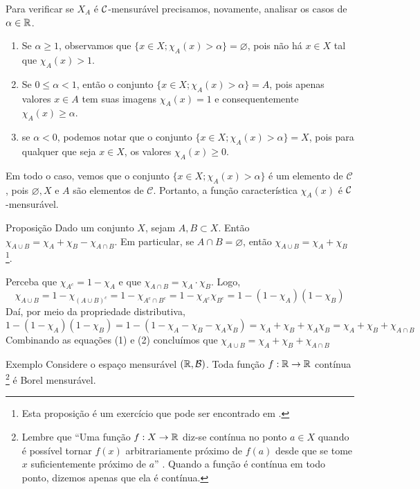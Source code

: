 Para verificar se $X_A$ é $\operatorname{\mathcal{C}}$-mensurável precisamos, novamente, analisar os casos de $\alpha \in \mathbb{R}$.
	\begin{enumerate}[label*= (\Roman*)]
		\item Se $\alpha \geq 1$, observamos que $\{x \in X; \chi_A(x)>  \alpha\} = \varnothing$, pois não há $x \in X$ tal que $\chi_A(x) > 1$.  
		\item Se $ 0 \leq \alpha < 1$, então o conjunto $\{x \in X; \chi_A(x)>  \alpha\} = A$, pois apenas valores $x \in A$ tem suas imagens $\chi_A(x) = 1$ e consequentemente $\chi_A(x) \geq \alpha$.
		\item  se $\alpha < 0$, podemos notar que o conjunto $\{x \in X; \chi_A(x)>  \alpha\} = X$, pois para qualquer que seja $x \in X$, os valores $\chi_A(x) \geq 0$.
	\end{enumerate}
Em todo o caso, vemos que o conjunto $\{x \in X; \chi_A(x)>  \alpha\}$ é um elemento de $\mathcal{C}$, pois $\varnothing, X$ e $A$ são elementos de $\mathcal{C}$. Portanto, a função característica $\chi_A(x)$ é $\operatorname{\mathcal{C}}$-mensurável.

\begin{env}{Proposição}
	\label{prop: propriedades de função característica}
	Dado um conjunto $X$, sejam $A, B \subset X$.
	Então $\chi_{A\cup B} = \chi_A + \chi_B - \chi_{A \cap B}$.
	Em particular, se $A \cap B = \varnothing$, então $\chi_{A\cup B} = \chi_A + \chi_B$
	\footnote{Esta proposição é um exercício que pode ser encontrado em \cite[p.57]{elon}.}.
\end{env}
\begin{prova}
	\hspace{-2.1cm}Perceba que 
	$\chi_{A^c} = 1 - \chi_A$ e que 
	$\chi_{A\cap B} = \chi_A\cdot \chi_B$.
	Logo, 
	\begin{equation}
		\chi_{A\cup B} = 1 - \chi_{(A\cup B)^c}
		= 1 - \chi_{A^c\cap B^c}
		= 1 - \chi_{A^c}\chi_{B^c}
		= 1 - (1-\chi_{A})(1-\chi_B)
	\end{equation}
	Daí, por meio da propriedade distributiva, 
	\begin{equation}
		1 - (1-\chi_{A})(1-\chi_B)
		=
		1 - (1 -\chi_{A} - \chi_{B} - \chi_{A}\chi_{B})
		=
		\chi_{A} + \chi_{B} + \chi_{A}\chi_{B}
		=
		\chi_{A} + \chi_{B} + \chi_{A\cap B}
	\end{equation}
	Combinando as equações (1) e (2) concluímos que 
	$
	\chi_{A\cup B}
	=
	\chi_{A} + \chi_{B} + \chi_{A\cap B}
	$
	
	\end{prova}
	\begin{env}{Exemplo}
	\label{ex:função-continua-mensuravel}
	    Considere o espaço mensurável $(\mathbb{R}, \operatorname{\mathcal{B}})$. 
	    Toda função $f: \mathbb{R} \to \mathbb{R}$ contínua
	    \footnote{
	    	Lembre que \enquote{Uma função $f : X \to \mathbb{R}$ diz-se contínua no ponto $a \in X$ quando é possível tornar 
	    	$f(x)$ arbitrariamente próximo de $f(a)$ desde que
	    	se tome $x$ suficientemente próximo de $a$} \cite[p.222]{elon}.
    		Quando a função é contínua em todo ponto, dizemos apenas que ela é contínua.
    	}
     		 é Borel mensurável.
	    \vspace{-0.2cm}
	\end{env}
	
